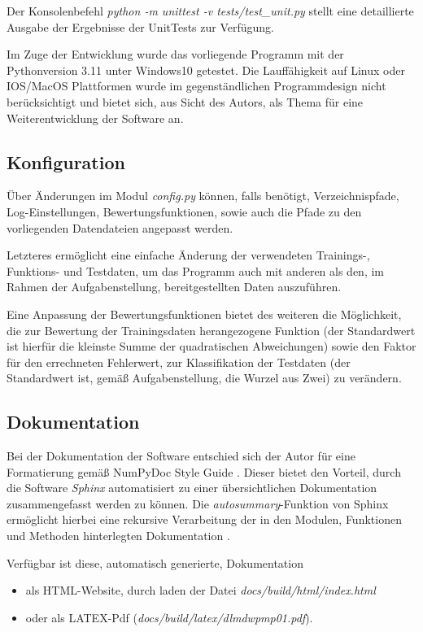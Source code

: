 Der Konsolenbefehl \emph{python -m unittest -v tests/test\_unit.py} stellt eine detaillierte Ausgabe der Ergebnisse der UnitTests zur Verfügung. 

Im Zuge der Entwicklung wurde das vorliegende Programm mit der Pythonversion 3.11 unter Windows10 getestet. Die Lauffähigkeit auf Linux oder IOS/MacOS Plattformen wurde im gegenständlichen Programmdesign nicht berücksichtigt und bietet sich, aus Sicht des Autors, als Thema für eine Weiterentwicklung der Software an.

\subsection{Konfiguration}

Über Änderungen im Modul \emph{config.py} können, falls benötigt, Verzeichnispfade, Log-Einstellungen, Bewertungsfunktionen, sowie auch die Pfade zu den vorliegenden Datendateien angepasst werden.

Letzteres ermöglicht eine einfache Änderung der verwendeten Trainings-, Funktions- und Testdaten, um das Programm auch mit anderen als den, im Rahmen der Aufgabenstellung, bereitgestellten Daten auszuführen.

Eine Anpassung der Bewertungsfunktionen bietet des weiteren die Möglichkeit, die zur Bewertung der Trainingsdaten herangezogene Funktion (der Standardwert ist hierfür die kleinste Summe der quadratischen Abweichungen) sowie den Faktor für den errechneten Fehlerwert, zur Klassifikation der Testdaten (der Standardwert ist, gemäß Aufgabenstellung, die Wurzel aus Zwei) zu verändern.

\subsection{Dokumentation}

Bei der Dokumentation der Software entschied sich der Autor für eine Formatierung gemäß NumPyDoc Style Guide \citep{numpydoc_v160_style_nodate}. Dieser bietet den Vorteil, durch die Software \emph{Sphinx} automatisiert zu einer übersichtlichen Dokumentation zusammengefasst werden zu können. Die \emph{autosummary}-Funktion von Sphinx ermöglicht hierbei eine rekursive Verarbeitung der in den Modulen, Funktionen und Methoden hinterlegten Dokumentation \citep{leedham_answer_2020}.

Verfügbar ist diese, automatisch generierte, Dokumentation
\begin{itemize}
 \itemsep0pt
 \item als HTML-Website, durch laden der Datei \emph{docs/build/html/index.html}
 \item oder als LATEX-Pdf (\emph{docs/build/latex/dlmdwpmp01.pdf}).
\end{itemize}


